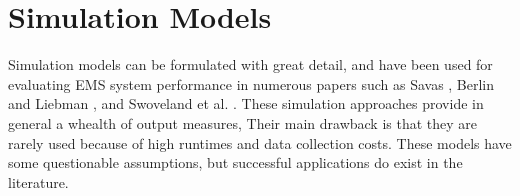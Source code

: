 \section{Simulation Models}
Simulation models
can be formulated with great detail,
and have been used for evaluating EMS system performance in numerous papers
such as Savas \cite{savas1969simulation},
Berlin and Liebman \cite{berlin1974mathematical},
and Swoveland et al. \cite{swoveland1973simulation}.
These simulation approaches provide
in general
a whealth of output measures,
Their main drawback
is that they are rarely used
because of high runtimes and data collection costs.
These models have some questionable assumptions,
but successful applications do exist in the literature.
